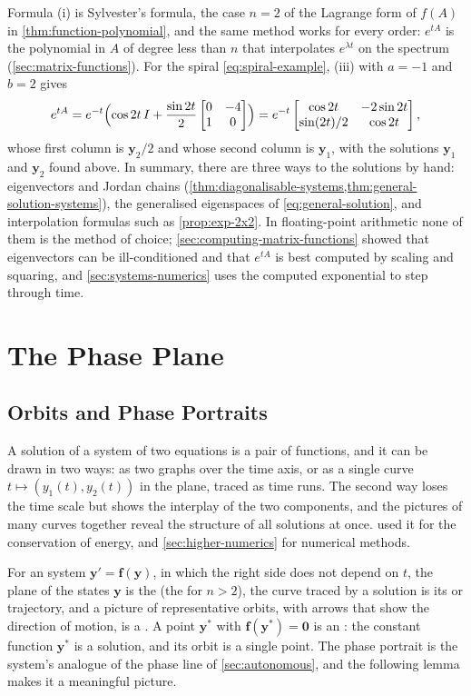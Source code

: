 Formula (i) is Sylvester's formula, the case $n=2$ of the Lagrange form of $f(A)$ in \cref{thm:function-polynomial}, and the same method works for every order: $e^{tA}$ is the polynomial in $A$ of degree less than $n$ that interpolates $e^{\lambda t}$ on the spectrum (\cref{sec:matrix-functions}). For the spiral \eqref{eq:spiral-example}, (iii) with $a=-1$ and $b=2$ gives
\[
e^{tA}=e^{-t}\Bigl(\cos2t\,I+\frac{\sin2t}2\begin{bmatrix}0&-4\\1&0\end{bmatrix}\Bigr)=e^{-t}\begin{bmatrix}\cos2t&-2\sin2t\\\sin(2t)/2&\cos2t\end{bmatrix},
\]
whose first column is $\mathbf y_2/2$ and whose second column is $\mathbf y_1$, with the solutions $\mathbf y_1$ and $\mathbf y_2$ found above. In summary, there are three ways to the solutions by hand: eigenvectors and Jordan chains (\cref{thm:diagonalisable-systems,thm:general-solution-systems}), the generalised eigenspaces of \eqref{eq:general-solution}, and interpolation formulas such as \cref{prop:exp-2x2}. In floating-point arithmetic none of them is the method of choice; \cref{sec:computing-matrix-functions} showed that eigenvectors can be ill-conditioned and that $e^{tA}$ is best computed by scaling and squaring, and \cref{sec:systems-numerics} uses the computed exponential to step through time.

\section{The Phase Plane}
\label{sec:phase-plane}

\subsection{Orbits and Phase Portraits}

A solution of a system of two equations is a pair of functions, and it can be drawn in two ways: as two graphs over the time axis, or as a single curve $t\mapsto(y_1(t),y_2(t))$ in the plane, traced as time runs. The second way loses the time scale but shows the interplay of the two components, and the pictures of many curves together reveal the structure of all solutions at once.  used it for the conservation of energy, and \cref{sec:higher-numerics} for numerical methods.

For an  system $\mathbf y'=\mathbf f(\mathbf y)$, in which the right side does not depend on $t$, the plane of the states $\mathbf y$ is the  (the  for $n>2$), the curve traced by a solution is its  or trajectory, and a picture of representative orbits, with arrows that show the direction of motion, is a . A point $\mathbf y^*$ with $\mathbf f(\mathbf y^*)=\mathbf 0$ is an : the constant function $\mathbf y^*$ is a solution, and its orbit is a single point. The phase portrait is the system's analogue of the phase line of \cref{sec:autonomous}, and the following lemma makes it a meaningful picture.

